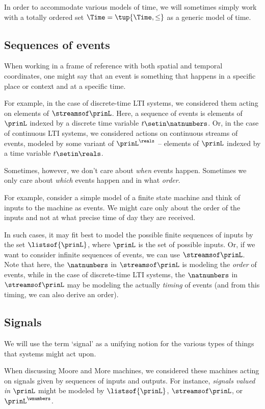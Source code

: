 In order to accommodate various models of time, we will sometimes simply work with a totally ordered set $\Time = \tup{\Time, \leq}$ as a generic model of time.

\subsection{Sequences of events}

When working in a frame of reference with both spatial and temporal coordinates, one might say that an event is something that happens in a specific place or context and at a specific time.

For example, in the case of discrete-time LTI systems, we considered them acting on elements of $\streamsof\prinL$.
Here, a sequence of events is elements of $\prinL$ indexed by a discrete time variable $t \setin \natnumbers$.
Or, in the case of continuous LTI systems, we considered actions on continuous streams of events, modeled by some variant of $\prinL^\reals$ -- elements of $\prinL$ indexed by a time variable $t \setin \reals$.

Sometimes, however, we don't care about \emph{when} events happen.
Sometimes we only care about  \emph{which} events happen and in what \emph{order}.

For example, consider a simple model of a finite state machine and think of inputs to the machine as events.
We might care only about the order of the inputs and not at what precise time of day they are received.

In such cases, it may fit best to model the possible finite sequences of inputs by the set $\listsof{\prinL}$, where $\prinL$ is the set of possible inputs.
Or, if we want to consider infinite sequences of events, we can use $\streamsof\prinL$.
Note that here, the $\natnumbers$ in $\streamsof\prinL$ is modeling the \emph{order} of events, while in the case of discrete-time LTI systems, the $\natnumbers$ in $\streamsof\prinL$ may be modeling the actually \emph{timing} of events (and from this timing, we can also derive an order).

\subsection{Signals}

We will use the term `signal' as a unifying notion for the various types of things that systems might act upon.

When discussing Moore and More machines, we considered these machines acting on signals given by sequences of inputs and outputs.
For instance, \emph{signals valued in} $\prinL$ might be modeled by $\listsof{\prinL}$, $\streamsof\prinL$, or $\prinL^\wnumbers$.

